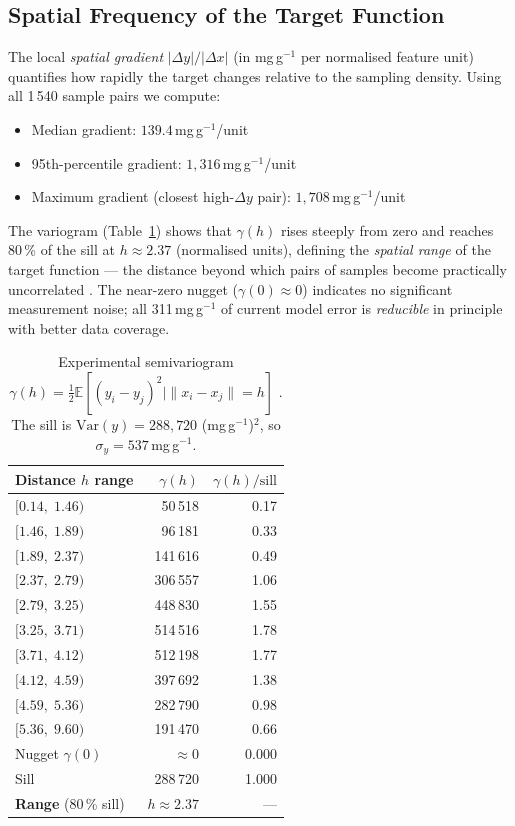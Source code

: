 \documentclass[12pt,a4paper]{article}
\begin{document}
\subsection{Spatial Frequency of the Target Function}

The local \emph{spatial gradient} $|\Delta y|/|\Delta x|$ (in
mg\,g$^{-1}$ per normalised feature unit) quantifies how rapidly the
target changes relative to the sampling density.  Using all 1\,540
sample pairs we compute:
\begin{itemize}[leftmargin=*]
  \item Median gradient: $139.4$\,mg\,g$^{-1}$/unit
  \item 95th-percentile gradient: $1{,}316$\,mg\,g$^{-1}$/unit
  \item Maximum gradient (closest high-$\Delta y$ pair): $1{,}708$\,mg\,g$^{-1}$/unit
\end{itemize}

The variogram (Table~\ref{tab:variogram}) shows that $\gamma(h)$ rises
steeply from zero and reaches 80\,\% of the sill at $h \approx 2.37$
(normalised units), defining the \emph{spatial range} of the target
function — the distance beyond which pairs of samples become practically
uncorrelated \citep{Webster2007}.  The near-zero nugget ($\gamma(0) \approx 0$) indicates no
significant measurement noise; all 311\,mg\,g$^{-1}$ of current model
error is \emph{reducible} in principle with better data coverage.

\begin{table}[h]
\centering
\caption{Experimental semivariogram $\gamma(h) = \tfrac{1}{2}\mathbb{E}[(y_i-y_j)^2 \mid \|x_i-x_j\|=h]$
  \citep{Matheron1963, Cressie1993}.
  The sill is $\text{Var}(y) = 288{,}720$ (mg\,g$^{-1}$)$^2$, so
  $\sigma_y = 537$\,mg\,g$^{-1}$.}
\label{tab:variogram}
\small
\begin{tabular}{lrr}
\toprule
Distance $h$ range & $\gamma(h)$ & $\gamma(h)/\text{sill}$ \\
\midrule
$[0.14,\;1.46)$ &  50\,518 & 0.17 \\
$[1.46,\;1.89)$ &  96\,181 & 0.33 \\
$[1.89,\;2.37)$ & 141\,616 & 0.49 \\
$[2.37,\;2.79)$ & 306\,557 & 1.06 \\
$[2.79,\;3.25)$ & 448\,830 & 1.55 \\
$[3.25,\;3.71)$ & 514\,516 & 1.78 \\
$[3.71,\;4.12)$ & 512\,198 & 1.77 \\
$[4.12,\;4.59)$ & 397\,692 & 1.38 \\
$[4.59,\;5.36)$ & 282\,790 & 0.98 \\
$[5.36,\;9.60)$ & 191\,470 & 0.66 \\
\midrule
Nugget $\gamma(0)$   & $\approx 0$ & 0.000 \\
Sill               & 288\,720    & 1.000 \\
\textbf{Range} (80\,\% sill) & $h \approx 2.37$ & — \\
\bottomrule
\end{tabular}
\end{table}
\end{document}
